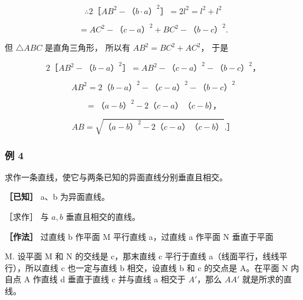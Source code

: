 \[
\therefore 2 \text{［} A B ^ {2} - \text{（}b \cdot a\text{）} ^ {2} \text{］} = 2 l ^ {2} = l ^ {2} + l ^ {2}
\]

\[
= A C ^ {2} - \text{（}c - a\text{）} ^ {2} + B C ^ {2} - \text{（}b - c\text{）} ^ {2}.
\]

但 \(\triangle ABC\) 是直角三角形， 所以有
\(AB^{2} = BC^{2} + AC^{2}\)， 于是

\[
2 \text{［} A B ^ {2} - \text{（}b - a\text{）} ^ {2} \text{］} = A B ^ {2} - \text{（}c - a\text{）} ^ {2} - \text{（}b - c\text{）} ^ {2}\text{，}
\]

\[
A B ^ {2} = 2 \text{（}b - a\text{）} ^ {2} - \text{（}c - a\text{）} ^ {2} - \text{（}b - c\text{）} ^ {2}
\]

\[
= \text{（}a - b\text{）} ^ {2} - 2 \text{（}c - a\text{）} \text{（}c - b\text{），}
\]

\[
A B = \sqrt {\text{（}a - b\text{）} ^ {2} - 2 \text{（}c - a\text{）} \text{（}c - b\text{）}}. \text{］}
\]

\subsubsection{例 4}

求作一条直线，使它与两条已知的异面直线分别垂直且相交。

\textbf{［已知］} a、b 为异面直线。

［求作］ 与 \(a, b\) 垂直且相交的直线。

\textbf{［作法］} 过直线 b 作平面 M 平行直线 a，过直线 a 作平面 N
垂直于平面

M. 设平面 M 和 N 的交线是 c，那末直线 c 平行于直线
a（线面平行，线线平行），所以直线 c 也一定与直线 b 相交，设直线 b 和 c
的交点是 A。在平面 N 内自点 A 作直线 d 垂直于直线 c 并与直线 a 相交于
\(A'\)，那么 \(AA'\) 就是所求的直线。

